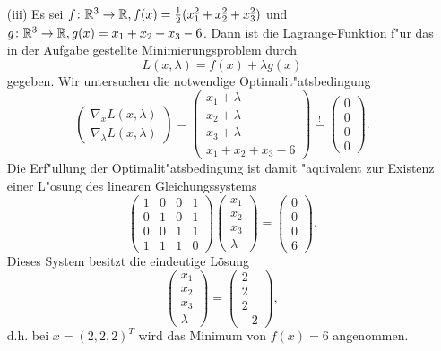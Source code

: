 \begin{itemize}
\item[(iii)] Es sei $f\colon\mathbb{R}^3 \to \mathbb{R}, f(x) =\frac{1}{2} (x_1^2 + x_2^2 + x_3^2)$ und
$g\colon\mathbb{R}^3 \to \mathbb{R}, g(x) = x_1 + x_2 + x_3 - 6$. Dann ist die Lagrange-Funktion
f"ur das in der Aufgabe gestellte Minimierungsproblem durch
\[
L(x, \lambda) = f(x) + \lambda g(x)
\]
gegeben. Wir untersuchen die notwendige Optimalit"atsbedingung
\[
\begin{pmatrix} \nabla_x L(x, \lambda) \\ \nabla_\lambda L(x, \lambda)\end{pmatrix}
= \begin{pmatrix}
x_1+\lambda\\x_2+\lambda\\x_3+\lambda \\ x_1 + x_2 + x_3 - 6 \end{pmatrix}
\overset{!}{=}\begin{pmatrix} 0 \\ 0\\0\\0 \end{pmatrix}.
\]
Die Erf"ullung der Optimalit"atsbedingung
ist damit "aquivalent zur Existenz einer L"osung des linearen Gleichungssystems
\[
\begin{pmatrix} 
1 & 0 & 0 &1 \\ 
0 & 1 & 0 &1 \\
0 & 0 & 1 &1\\
1 & 1 & 1 & 0
\end{pmatrix}\begin{pmatrix} x_1 \\ x_2 \\ x_3 \\\lambda\end{pmatrix}
= \begin{pmatrix} 0\\0\\0 \\ 6 \end{pmatrix}.
\]
Dieses System besitzt die eindeutige Lösung
\[\begin{pmatrix} x_1 \\ x_2 \\ x_3 \\\lambda\end{pmatrix}
=\begin{pmatrix} 2 \\ 2 \\ 2 \\-2\end{pmatrix},
\]
d.h. bei $x=(2,2,2)^T$ wird das Minimum von $f(x)=6$ angenommen.
\end{itemize}
